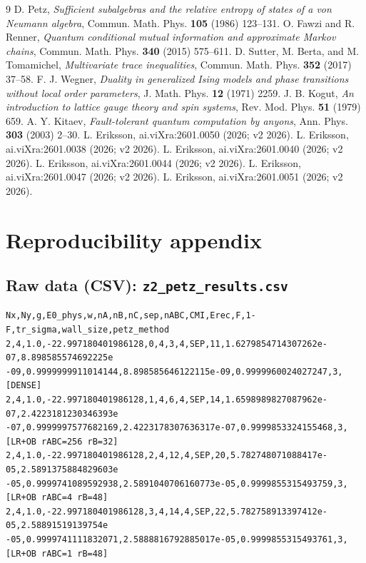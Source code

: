 \documentclass[11pt]{article}
\begin{document}
\begin{thebibliography}{9}
 D. Petz, \emph{Sufficient subalgebras and the relative
entropy of states of a von Neumann algebra}, Commun. Math. Phys.
\textbf{105} (1986) 123--131.
 O. Fawzi and R. Renner, \emph{Quantum conditional mutual
information and approximate Markov chains}, Commun. Math. Phys.
\textbf{340} (2015) 575--611.
 D. Sutter, M. Berta, and M. Tomamichel,
\emph{Multivariate trace inequalities}, Commun. Math. Phys. \textbf{352}
(2017) 37--58.
 F. J. Wegner, \emph{Duality in generalized Ising models
and phase transitions without local order parameters}, J. Math. Phys.
\textbf{12} (1971) 2259.
 J. B. Kogut, \emph{An introduction to lattice gauge
theory and spin systems}, Rev. Mod. Phys. \textbf{51} (1979) 659.
 A. Y. Kitaev, \emph{Fault-tolerant quantum computation
by anyons}, Ann. Phys. \textbf{303} (2003) 2--30.
 L. Eriksson, ai.viXra:2601.0050 (2026; v2 2026).
 L. Eriksson, ai.viXra:2601.0038 (2026; v2 2026).
 L. Eriksson, ai.viXra:2601.0040 (2026; v2 2026).
 L. Eriksson, ai.viXra:2601.0044 (2026; v2 2026).
 L. Eriksson, ai.viXra:2601.0047 (2026; v2 2026).
 L. Eriksson, ai.viXra:2601.0051 (2026; v2 2026).
\end{thebibliography}

\appendix

\section{Reproducibility appendix}

\subsection{Raw data (CSV): \texttt{z2\_petz\_results.csv}}

{\scriptsize
\begin{verbatim}
Nx,Ny,g,E0_phys,w,nA,nB,nC,sep,nABC,CMI,Erec,F,1-F,tr_sigma,wall_size,petz_method
2,4,1.0,-22.997180401986128,0,4,3,4,SEP,11,1.6279854714307262e-07,8.898585574692225e
-09,0.9999999911014144,8.898585646122115e-09,0.9999960024027247,3,[DENSE]
2,4,1.0,-22.997180401986128,1,4,6,4,SEP,14,1.6598989827087962e-07,2.4223181230346393e
-07,0.9999997577682169,2.4223178307636317e-07,0.9999853324155468,3,[LR+OB rABC=256 rB=32]
2,4,1.0,-22.997180401986128,2,4,12,4,SEP,20,5.782748071088417e-05,2.5891375884829603e
-05,0.9999741089592938,2.5891040706160773e-05,0.9999855315493759,3,[LR+OB rABC=4 rB=48]
2,4,1.0,-22.997180401986128,3,4,14,4,SEP,22,5.782758913397412e-05,2.58891519139754e
-05,0.9999741111832071,2.5888816792885017e-05,0.9999855315493761,3,[LR+OB rABC=1 rB=48]
\end{verbatim}
}
\end{document}
